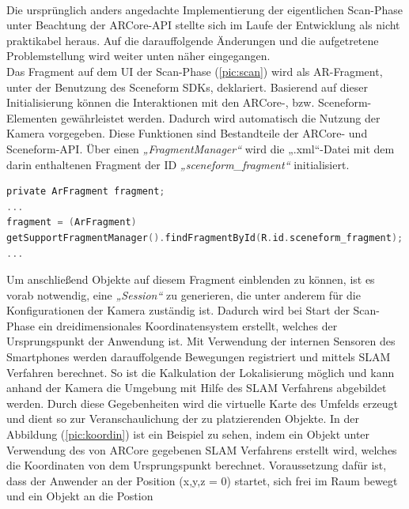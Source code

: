 \\ 
\linebreak
Die ursprünglich anders angedachte Implementierung der eigentlichen Scan-Phase unter Beachtung der ARCore-\acs{API} stellte sich im Laufe der Entwicklung 
als nicht praktikabel heraus. Auf die darauffolgende Änderungen und die aufgetretene Problemstellung wird weiter unten näher eingegangen. 
\\ 
Das Fragment auf dem \acl{UI} der Scan-Phase (\ref{pic:scan}) wird als \acs{AR}-Fragment, unter der Benutzung des Sceneform \acs{SDK}s, deklariert. Basierend auf 
dieser Initialisierung können die Interaktionen mit den ARCore-, bzw. Sceneform- Elementen gewährleistet werden. Dadurch wird automatisch die Nutzung der Kamera 
vorgegeben. Diese Funktionen sind Bestandteile der ARCore- und Sceneform-\acs{API}. Über einen \textit{„FragmentManager“} wird die „.xml“-Datei mit dem darin 
enthaltenen Fragment der ID \textit{„sceneform\_fragment“} initialisiert.
\\
\begin{lstlisting}[language=C,
    frame=lines,           % Ein Rahmen um den Code (single for box, lines for top and bottom)
    xleftmargin=\parindent,  % Rahmen link von den Zahlen
    style=algoBericht,
    label={code:arfragment},
    captionpos=b,           % Caption unter den Code setzen
caption={Initialisierung des Fragments}]
private ArFragment fragment;
...
fragment = (ArFragment)
getSupportFragmentManager().findFragmentById(R.id.sceneform_fragment);
...
\end{lstlisting}
Um anschließend Objekte auf diesem Fragment einblenden zu können, ist es vorab notwendig, eine \textit{„Session“} zu generieren, die unter anderem für die 
Konfigurationen der Kamera zuständig ist. Dadurch wird bei Start der Scan-Phase ein dreidimensionales Koordinatensystem erstellt, welches der Ursprungspunkt der 
Anwendung ist. Mit Verwendung der internen Sensoren des Smartphones werden darauffolgende Bewegungen registriert und mittels \acs{SLAM} Verfahren berechnet. 
So ist die Kalkulation der Lokalisierung möglich und kann anhand der Kamera die Umgebung mit Hilfe des \acs{SLAM} Verfahrens abgebildet werden. Durch diese 
Gegebenheiten wird die virtuelle Karte des Umfelds erzeugt und dient so zur Veranschaulichung der zu platzierenden Objekte. In der Abbildung (\ref{pic:koordin}) 
ist ein Beispiel zu sehen, indem ein Objekt unter Verwendung des von ARCore gegebenen \acs{SLAM} Verfahrens erstellt wird, welches die Koordinaten von dem 
Ursprungspunkt berechnet. Voraussetzung dafür ist, dass der Anwender an der Position (x,y,z = 0) startet, sich frei im Raum bewegt und ein Objekt an die Postion 
